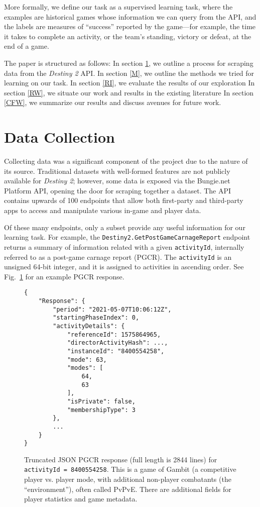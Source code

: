 \documentclass[conference]{IEEEtran}
\begin{document}
More formally, we define our task as a supervised learning task, where the
examples are historical games whose information we can query from the API, and
the labels are measures of ``success'' reported by the game—for example, the
time it takes to complete an activity, or the team's standing, victory or
defeat, at the end of a game.

The paper is structured as follows: In section \ref{DC}, we
outline a process for scraping data from the \textit{Destiny 2} API. In
section \ref{M}, we outline the methods we tried for learning on
our task. In section \ref{RI}, we evaluate the results of our
exploration In section \ref{RW}, we situate our work and results
in the existing literature In section \ref{CFW}, we summarize our
results and discuss avenues for future work.

\section{Data Collection}\label{DC}

Collecting data was a significant component of the project due to the nature of
its source. Traditional datasets with well-formed features are not publicly
available for \textit{Destiny 2}; however, some data is exposed via the
Bungie.net Platform API, opening the door for scraping together a dataset. The
API contains upwards of 100 endpoints that allow both first-party and
third-party apps to access and manipulate various in-game and player data.

Of these many endpoints, only a subset provide any useful information for our
learning task. For example, the \texttt{Destiny2.GetPostGameCarnageReport} endpoint returns a
summary of information related with a given \texttt{activityId}, internally
referred to as a post-game carnage report (PGCR). The \texttt{activityId} is
an unsigned 64-bit integer, and it is assigned to activities in ascending
order. See Fig.~\ref{response} for an example PGCR response.

\begin{figure}[htbp]
    \begin{verbatim}
{
    "Response": {
        "period": "2021-05-07T10:06:12Z",
        "startingPhaseIndex": 0,
        "activityDetails": {
            "referenceId": 1575864965,
            "directorActivityHash": ...,
            "instanceId": "8400554258",
            "mode": 63,
            "modes": [
                64,
                63
            ],
            "isPrivate": false,
            "membershipType": 3
        },
        ...
    }
}
    \end{verbatim}
    \caption{Truncated JSON PGCR response (full length is 2844 lines) for
        \texttt{activityId = 8400554258}. This is a game of Gambit (a competitive player vs.
        player mode, with additional non-player combatants (the ``environment''), often called PvPvE.
        There are additional fields for player statistics and
        game metadata.}
    \label{response}
\end{figure}
\end{document}
